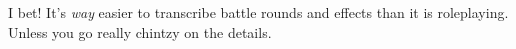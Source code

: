 I bet! It's {\itshape way} easier to transcribe battle rounds and effects than it is roleplaying. Unless you go really chintzy on the details. 